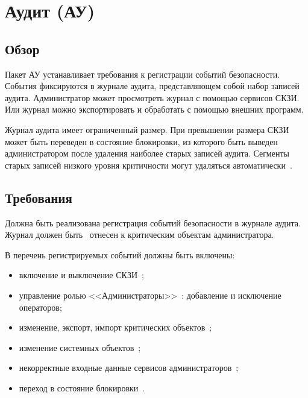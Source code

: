 \section{Аудит (АУ)}\label{AU}

\subsection{Обзор}\label{AU.Defs}

Пакет АУ устанавливает требования к регистрации событий безопасности.
События фиксируются в журнале аудита, представляющем собой набор 
записей аудита.
%
Администратор может просмотреть журнал с помощью сервисов СКЗИ.
Или журнал можно экспортировать и обработать с помощью внешних программ.

Журнал аудита имеет ограниченный размер. При превышении размера
СКЗИ может быть переведен в состояние блокировки, из которого быть
выведен администратором после удаления наиболее старых записей аудита. 
%
Сегменты старых записей низкого уровня критичности могут удаляться 
автоматически~.

\subsection{Требования}\label{AU.Reqs}


\label{R.AU.Log}
Должна быть реализована регистрация событий безопасности в журнале аудита.
Журнал должен быть~ отнесен к критическим объектам
администратора.

\label{R.AU.Events}
В перечень регистрируемых событий должны быть включены:
\begin{itemize} 
\item
включение и выключение СКЗИ~;
\item
управление ролью <<Администраторы>>~: 
добавление и исключение операторов; 
\item
изменение, экспорт, импорт критических объектов~; 
\item
изменение системных объектов~; 
\item
некорректные входные данные сервисов администраторов~;
\item
переход в состояние блокировки~.
\end{itemize}

